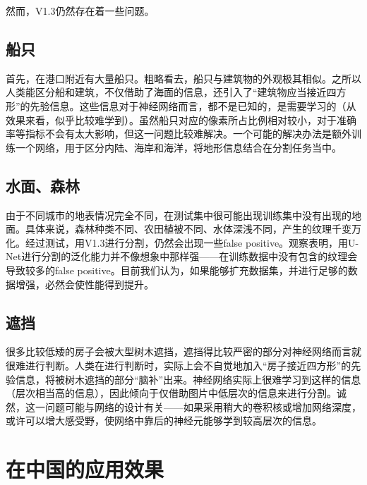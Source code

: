 \documentclass[a4paper,12pt]{article}
\begin{document}
\begin{CJK*}{UTF8}{gbsn}
\begin{spacing}{1.2}
    然而，V1.3仍然存在着一些问题。
    \subsection{船只}
    首先，在港口附近有大量船只。粗略看去，船只与建筑物的外观极其相似。之所以人类能区分船和建筑，不仅借助了海面的信息，还引入了“建筑物应当接近四方形”的先验信息。这些信息对于神经网络而言，都不是已知的，是需要学习的（从效果来看，似乎比较难学到）。虽然船只对应的像素所占比例相对较小，对于准确率等指标不会有太大影响，但这一问题比较难解决。一个可能的解决办法是额外训练一个网络，用于区分内陆、海岸和海洋，将地形信息结合在分割任务当中。
    \subsection{水面、森林}
    由于不同城市的地表情况完全不同，在测试集中很可能出现训练集中没有出现的地面。具体来说，森林种类不同、农田植被不同、水体深浅不同，产生的纹理千变万化。经过测试，用V1.3进行分割，仍然会出现一些false positive。观察表明，用U-Net进行分割的泛化能力并不像想象中那样强——在训练数据中没有包含的纹理会导致较多的false positive。目前我们认为，如果能够扩充数据集，并进行足够的数据增强，必然会使性能得到提升。
    \subsection{遮挡}
    很多比较低矮的房子会被大型树木遮挡，遮挡得比较严密的部分对神经网络而言就很难进行判断。人类在进行判断时，实际上会不自觉地加入“房子接近四方形”的先验信息，将被树木遮挡的部分“脑补”出来。神经网络实际上很难学习到这样的信息（层次相当高的信息），因此倾向于仅借助图片中低层次的信息来进行分割。诚然，这一问题可能与网络的设计有关——如果采用稍大的卷积核或增加网络深度，或许可以增大感受野，使网络中靠后的神经元能够学到较高层次的信息。
    



    \section{在中国的应用效果}

\end{spacing}
\end{CJK*}
\end{document}
